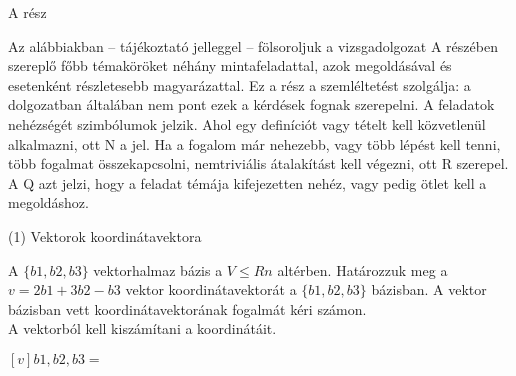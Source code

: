 

\begin{frame}[plain]
\begin{tcolorbox}[center, colback={myyellow}, coltext={black}, colframe={myyellow}]
    {\RHuge  A rész}
    \mmedskip
\end{tcolorbox}
\end{frame}

\begin{frame}
  \begin{tcolorbox}[title={2. (4p)}]
Az alábbiakban – tájékoztató jelleggel – fölsoroljuk a vizsgadolgozat A részében szereplő főbb témaköröket néhány mintafeladattal, azok megoldásával és esetenként részletesebb magyarázattal. Ez a rész a szemléltetést szolgálja: a dolgozatban általában nem pont ezek a kérdések fognak szerepelni. A feladatok nehézségét szimbólumok jelzik. Ahol egy deﬁníciót vagy tételt kell közvetlenül alkalmazni, ott N a jel. Ha a fogalom már nehezebb, vagy több lépést kell tenni, több fogalmat összekapcsolni, nemtriviális átalakítást kell végezni, ott R szerepel. A Q azt jelzi, hogy a feladat témája kifejezetten nehéz, vagy pedig ötlet kell a megoldáshoz.
  \end{tcolorbox}
\end{frame}

\begin{frame}[plain]
\begin{tcolorbox}[center, colback={myyellow}, coltext={black}, colframe={myyellow}]
    {\RHuge  (1) Vektorok koordinátavektora}
    \mmedskip
\end{tcolorbox}
\end{frame}

\begin{frame}
  \begin{tcolorbox}[title={1/1. -N-}]
      A $\{b1,b2,b3\}$ vektorhalmaz bázis a $V ≤ Rn$ altérben. Határozzuk meg a $v = 2b1 + 3b2 −b3$ vektor koordinátavektorát a $\{b1,b2,b3\}$ bázisban.
  \tcblower
    A vektor bázisban vett koordinátavektorának fogalmát kéri számon.\\
    
    A vektorból kell kiszámítani a koordinátáit.\\
    \mmedskip 
  
   $[v]b1,b2,b3 =$ 
  \end{tcolorbox}
\end{frame}

